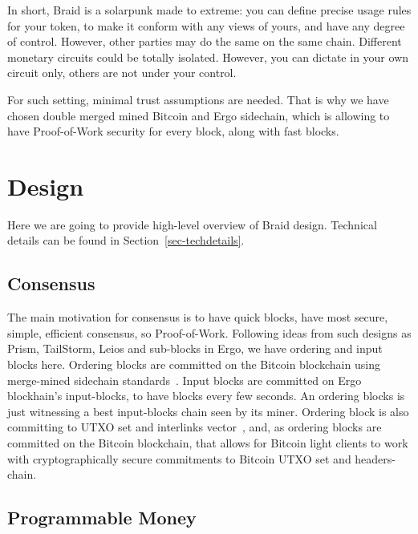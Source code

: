 \documentclass{llncs}   %
\newcommand{\bc}{Braid}
\begin{document}
In short, \bc{} is a solarpunk made to extreme: you can define precise usage rules for your token, to make it conform with any views of yours, and have any degree of control. However, other parties may do the same on the same chain. Different monetary circuits could be totally isolated. However, you can dictate in your own circuit only, others are not under your control.

For such setting, minimal trust assumptions are needed. That is why we have chosen double merged mined Bitcoin and Ergo sidechain, which is allowing to have Proof-of-Work security for every block, along with fast blocks. 


\section{Design}
\label{sec-design}

Here we are going to provide high-level overview of \bc{} design. Technical details can be found in Section~\ref{sec-techdetails}. 


\subsection{Consensus}

The main motivation for consensus is to have quick blocks, have most secure, simple, efficient consensus, so Proof-of-Work. Following ideas from such designs as Prism, TailStorm, Leios and sub-blocks in Ergo, we have ordering and input blocks here. Ordering blocks are committed on the Bitcoin blockchain using merge-mined sidechain standards~\cite{bitcoinmm}.
Input blocks are committed on Ergo blockhain's input-blocks, to have blocks every few seconds. An ordering blocks is just witnessing a best input-blocks chain seen by
its miner. Ordering block is also committing to UTXO set and interlinks vector~\cite{kiayias2020non}, and, as ordering blocks are committed on the Bitcoin blockchain, that
allows for Bitcoin light clients to work with cryptographically secure commitments to Bitcoin UTXO set and headers-chain.

\subsection{Programmable Money}
\end{document}
